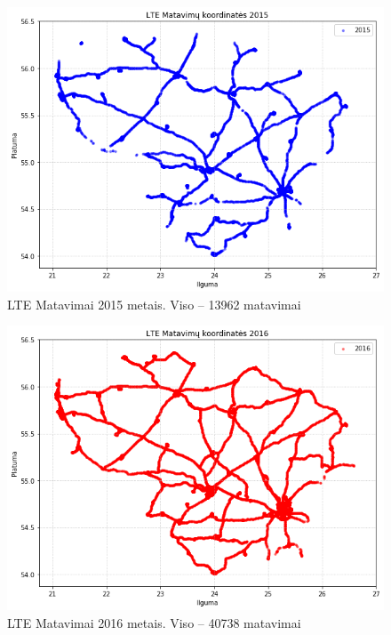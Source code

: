 \documentclass{VUMIFPSbakalaurinis}
\begin{document}
\begin{figure}[H]
	\centering
	\includegraphics[scale=0.33]{img/LTE-2}
	\caption{LTE Matavimai 2015 metais. Viso – 13962 matavimai}
	\label{img:LTE-2}
\end{figure}
\begin{figure}[H]
	\centering
	\includegraphics[scale=0.33]{img/LTE-3}
	\caption{LTE Matavimai 2016 metais. Viso – 40738 matavimai}
	\label{img:LTE-3}
\end{figure}
\end{document}
